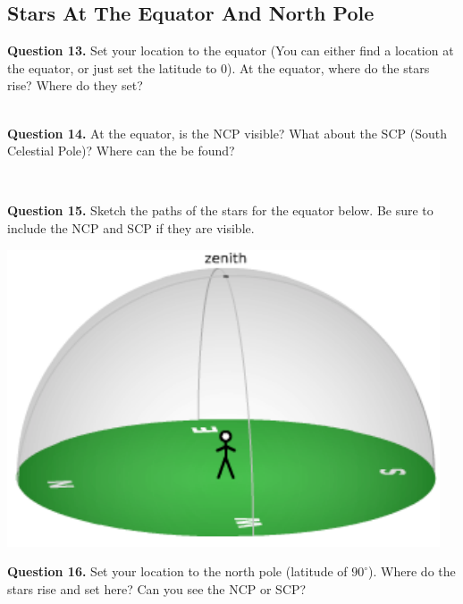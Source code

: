 \documentclass[11pt]{article}
\begin{document}
\subsection{Stars At The Equator And North Pole}

\textbf{Question 13.} Set your location to the equator (You can either find a location at the equator, or just set the latitude to 0). At the equator, where do the stars rise? Where do they set? \\
\vspace*{1.5cm}

\hrulefill\\

\textbf{Question 14.} At the equator, is the NCP visible? What about the SCP (South Celestial Pole)? Where can the be found? \\
\vspace*{1.5cm}

\hrulefill\\

\newpage

\textbf{Question 15.} Sketch the paths of the stars for the equator below. Be sure to include the NCP and SCP if they are visible. \\
\vspace*{1.5cm}

\begin{center}
	\includegraphics{local_sky} 
\end{center}

\textbf{Question 16.} Set your location to the north pole (latitude of $90^\circ$). Where do the stars rise and set here? Can you see the NCP or SCP?\\
\vspace*{1.5cm}
\end{document}

